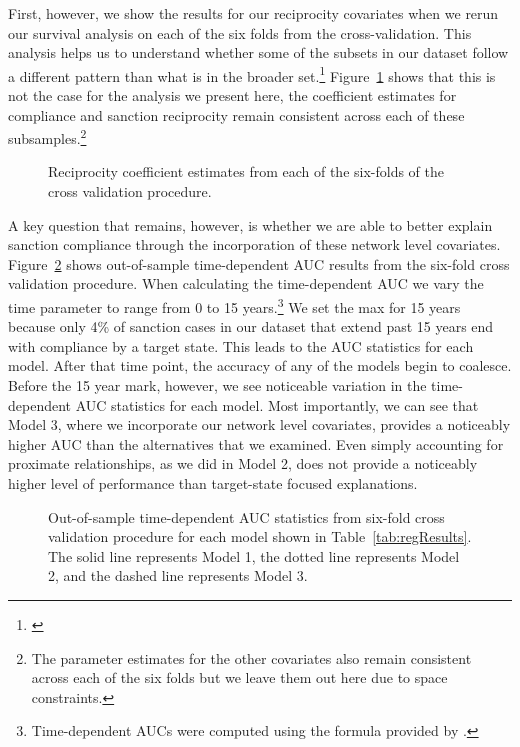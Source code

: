 
First, however, we show the results for our reciprocity covariates when we rerun our survival analysis on each of the six folds from the cross-validation. This analysis helps us to understand whether some of the subsets in our dataset follow a different pattern than what is in the broader set.\footnote{\cite{beck2008time}} Figure~\ref{fig:crossval} shows that this is not the case for the analysis we present here, the coefficient estimates for compliance and sanction reciprocity remain consistent across each of these subsamples.\footnote{The parameter estimates for the other covariates also remain consistent across each of the six folds but we leave them out here due to space constraints.}


\begin{figure}[ht]
	\centering
	\caption{Reciprocity coefficient estimates from each of the six-folds of the cross validation procedure.}
	\resizebox{1\textwidth}{!}{}
	\label{fig:crossval}
\end{figure}


A key question that remains, however, is whether we are able to better explain sanction compliance through the incorporation of these network level covariates. Figure~\ref{fig:auc} shows out-of-sample time-dependent AUC results from the six-fold cross validation procedure. When calculating the time-dependent AUC we vary the time parameter to range from 0 to 15 years.\footnote{Time-dependent AUCs were computed using the formula provided by \citet{chambless2006estimation}.} We set the max for 15 years because only 4\% of sanction cases in our dataset that extend past 15 years end with compliance by a target state. This leads to the AUC statistics for each model. After that time point, the accuracy of any of the models begin to coalesce. Before the 15 year mark, however, we see noticeable variation in the time-dependent AUC statistics for each model. Most importantly, we can see that Model 3, where we incorporate our network level covariates, provides a noticeably higher AUC than the alternatives that we examined. Even simply accounting for proximate relationships, as we did in Model 2, does not provide a noticeably higher level of performance than target-state focused explanations.

\begin{figure}[ht]
	\centering
	\caption{Out-of-sample time-dependent AUC statistics from six-fold cross validation procedure for each model shown in Table~\ref{tab:regResults}. The solid line represents Model 1, the dotted line represents Model 2, and the dashed line represents Model 3.}
	\resizebox{0.8\textwidth}{!}{}
	\label{fig:auc}
\end{figure}